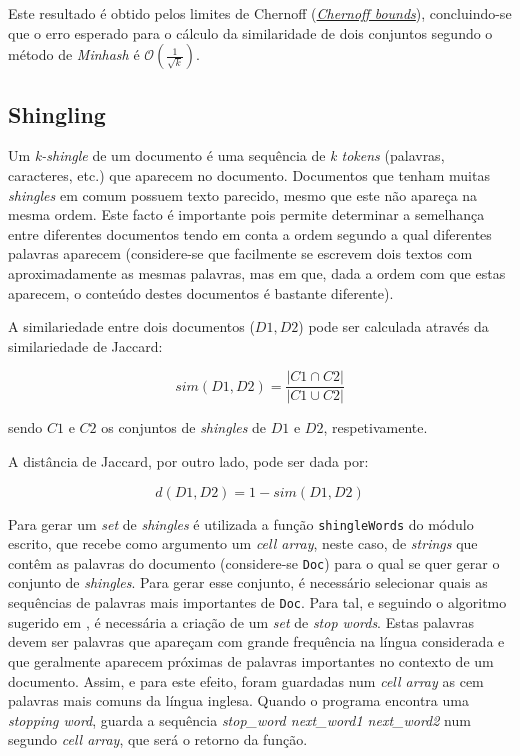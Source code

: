 \documentclass[a4paper,11pt,openright,oneside]{report}
\begin{document}
Este resultado é obtido pelos limites de Chernoff (\textit{\href{https://en.wikipedia.org/wiki/Chernoff\_bound}{Chernoff bounds}}), concluindo-se que o erro esperado para o cálculo da similaridade de dois conjuntos segundo o método de \textit{Minhash} é $\mathcal{O}\left(\frac{1}{\sqrt{k}}\right)$.

\subsection{Shingling}
\label{subsec.shingling}

Um \textit{k-shingle} de um documento é uma sequência de \textit{k tokens} (palavras, caracteres, etc.) que aparecem no documento. Documentos que tenham muitas \textit{shingles} em comum possuem texto parecido, mesmo que este não apareça na mesma ordem. Este facto é importante pois permite determinar a semelhança entre diferentes documentos tendo em conta a ordem segundo a qual diferentes palavras aparecem (considere-se que facilmente se escrevem dois textos com aproximadamente as mesmas palavras, mas em que, dada a ordem com que estas aparecem, o conteúdo destes documentos é bastante diferente).

A similariedade entre dois documentos ($D1, D2$) pode ser calculada através da similariedade de Jaccard:

$$ sim(D1, D2) = \frac{|C1\cap C2|}{|C1\cup C2|} $$

sendo $C1$ e $C2$ os conjuntos de \textit{shingles} de $D1$ e $D2$, respetivamente.

A distância de Jaccard, por outro lado, pode ser dada por:

$$ d(D1, D2) = 1 - sim(D1, D2) $$

Para gerar um \textit{set} de \textit{shingles} é utilizada a função \texttt{shingleWords} do módulo escrito, que recebe como argumento um \textit{cell array}, neste caso, de \textit{strings} que contêm as palavras do documento (considere-se \texttt{Doc}) para o qual se quer gerar o conjunto de \textit{shingles}. Para gerar esse conjunto, é necessário selecionar quais as sequências de palavras mais importantes de \texttt{Doc}. Para tal, e seguindo o algoritmo sugerido em \cite{book1}, é necessária a criação de um \textit{set} de \textit{stop words}. Estas palavras devem ser palavras que apareçam com grande frequência na língua considerada e que geralmente aparecem próximas de palavras importantes no contexto de um documento. Assim, e para este efeito, foram guardadas num \textit{cell array} as cem palavras mais comuns da língua inglesa. Quando o programa encontra uma \textit{stopping word}, guarda a sequência \textit{stop\_word next\_word1 next\_word2} num segundo \textit{cell array}, que será o retorno da função.
\end{document}
